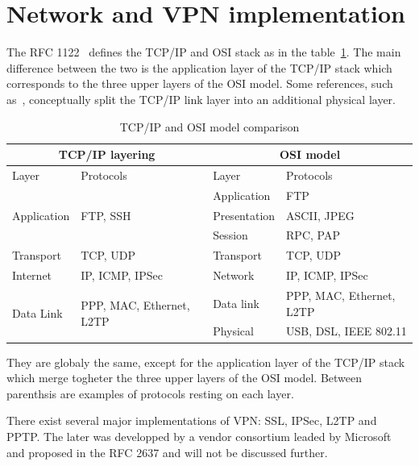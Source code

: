 \section{Network and VPN implementation}\label{sec:theory-network}

The RFC 1122~\cite{rfc1122} defines the TCP/IP and OSI stack as in the table~\ref{tab:tcp-ip-stack}.
The main difference between the two is the application layer of the TCP/IP stack which corresponds to the three upper layers of the OSI model.
Some references, such as~\citet{tanenbaum2011}, conceptually split the TCP/IP link layer into an additional physical layer.

\begin{table}[ht]
\center
\begin{tabularx}{\textwidth}{|l|l|l|X|} \hline
\multicolumn{2}{|c|}{TCP/IP layering} & \multicolumn{2}{c|}{OSI model} \\ \hline
Layer & Protocols & Layer & Protocols \\ \hline
\multirow{3}{*}{Application} & \multirow{3}{*}{FTP, SSH} & Application & FTP \\ \cline{3-4}
 & & Presentation & ASCII, JPEG \\ \cline{3-4}
 & & Session & RPC, PAP \\ \hline
Transport & TCP, UDP & Transport & TCP, UDP \\ \hline
Internet & IP, ICMP, IPSec & Network & IP, ICMP, IPSec \\ \hline
\multirow{2}{*}{Data Link} & \multirow{2}{*}{PPP, MAC, Ethernet, L2TP} & Data link & PPP, MAC, Ethernet, L2TP \\ \cline{3-4}
 & & Physical & USB, DSL, IEEE 802.11 \\ \hline
\end{tabularx}
\caption{TCP/IP and OSI model comparison}{They are globaly the same, except for the application layer of the TCP/IP stack which merge togheter the three upper layers of the OSI model. Between parenthsis are examples of protocols resting on each layer.}
\label{tab:tcp-ip-stack}
\end{table}



There exist several major implementations of VPN: SSL, IPSec, L2TP and PPTP.
The later was developped by a vendor consortium leaded by Microsoft and proposed in the RFC 2637 and will not be discussed further.

